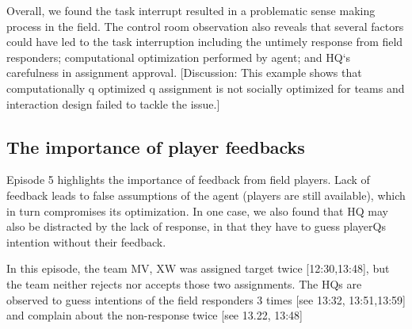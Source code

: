 Overall, we found the task interrupt resulted in a problematic sense making process in the field. The control room observation also reveals that several factors could have led to the task interruption including the untimely response from field responders; computational optimization performed by agent; and HQ`s carefulness in assignment approval. [Discussion: This example shows that computationally q optimized q assignment is not socially optimized for teams and interaction design failed to tackle the issue.]\\

\subsection{The importance of player feedbacks}
Episode 5 highlights the importance of feedback from field players. Lack of feedback leads to false assumptions of the agent (players are still available), which in turn compromises its optimization. In one case, we also found that HQ may also be distracted by the lack of response, in that they have to guess playerQs intention without their feedback. \\

\noindent{} 

In this episode, the team MV, XW was assigned target twice [12:30,13:48], but the team neither rejects nor accepts those two assignments. The HQs are observed to guess intentions of the field responders 3 times [see 13:32, 13:51,13:59] and complain about the non-response twice [see 13.22, 13:48]

